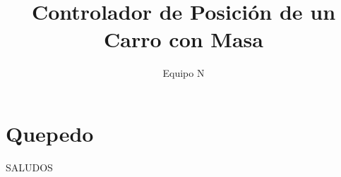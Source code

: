 \documentclass[12pt]{article}
\title{Controlador de Posición de un Carro con Masa}
\author{Equipo N}
\begin{document}
  \maketitle

  \section{Quepedo}

    SALUDOS
\end{document}
